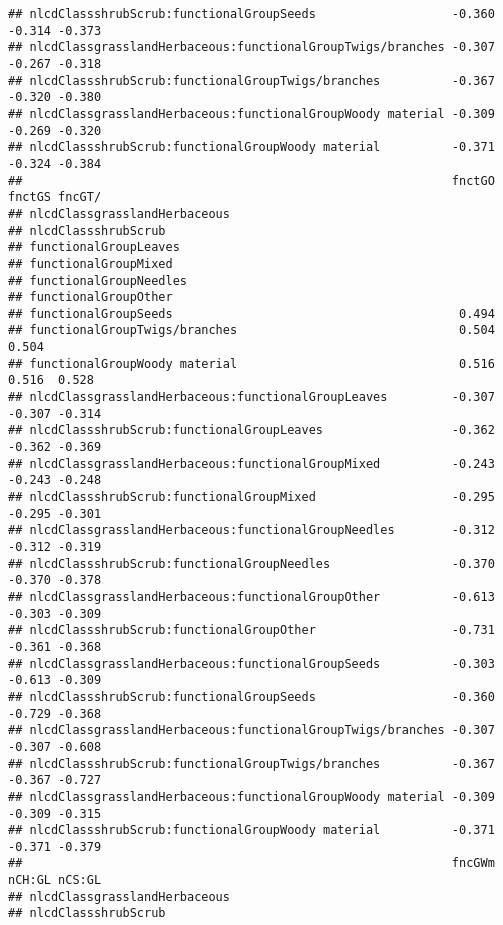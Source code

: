 \documentclass[]{article}
\begin{document}
\begin{verbatim}
## nlcdClassshrubScrub:functionalGroupSeeds                   -0.360 -0.314 -0.373
## nlcdClassgrasslandHerbaceous:functionalGroupTwigs/branches -0.307 -0.267 -0.318
## nlcdClassshrubScrub:functionalGroupTwigs/branches          -0.367 -0.320 -0.380
## nlcdClassgrasslandHerbaceous:functionalGroupWoody material -0.309 -0.269 -0.320
## nlcdClassshrubScrub:functionalGroupWoody material          -0.371 -0.324 -0.384
##                                                            fnctGO fnctGS fncGT/
## nlcdClassgrasslandHerbaceous                                                   
## nlcdClassshrubScrub                                                            
## functionalGroupLeaves                                                          
## functionalGroupMixed                                                           
## functionalGroupNeedles                                                         
## functionalGroupOther                                                           
## functionalGroupSeeds                                        0.494              
## functionalGroupTwigs/branches                               0.504  0.504       
## functionalGroupWoody material                               0.516  0.516  0.528
## nlcdClassgrasslandHerbaceous:functionalGroupLeaves         -0.307 -0.307 -0.314
## nlcdClassshrubScrub:functionalGroupLeaves                  -0.362 -0.362 -0.369
## nlcdClassgrasslandHerbaceous:functionalGroupMixed          -0.243 -0.243 -0.248
## nlcdClassshrubScrub:functionalGroupMixed                   -0.295 -0.295 -0.301
## nlcdClassgrasslandHerbaceous:functionalGroupNeedles        -0.312 -0.312 -0.319
## nlcdClassshrubScrub:functionalGroupNeedles                 -0.370 -0.370 -0.378
## nlcdClassgrasslandHerbaceous:functionalGroupOther          -0.613 -0.303 -0.309
## nlcdClassshrubScrub:functionalGroupOther                   -0.731 -0.361 -0.368
## nlcdClassgrasslandHerbaceous:functionalGroupSeeds          -0.303 -0.613 -0.309
## nlcdClassshrubScrub:functionalGroupSeeds                   -0.360 -0.729 -0.368
## nlcdClassgrasslandHerbaceous:functionalGroupTwigs/branches -0.307 -0.307 -0.608
## nlcdClassshrubScrub:functionalGroupTwigs/branches          -0.367 -0.367 -0.727
## nlcdClassgrasslandHerbaceous:functionalGroupWoody material -0.309 -0.309 -0.315
## nlcdClassshrubScrub:functionalGroupWoody material          -0.371 -0.371 -0.379
##                                                            fncGWm nCH:GL nCS:GL
## nlcdClassgrasslandHerbaceous                                                   
## nlcdClassshrubScrub                                                            

\end{verbatim}
\end{document}

